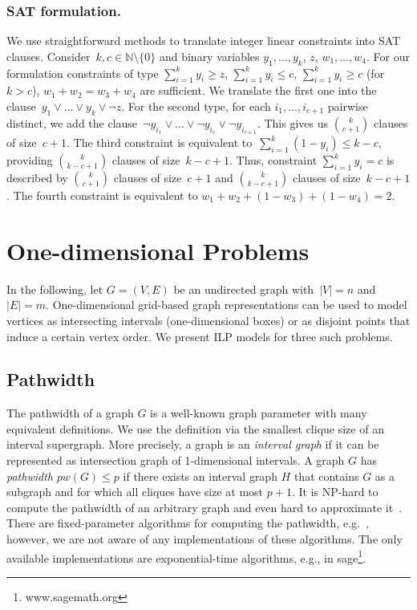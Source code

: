 \documentclass[runningheads]{llncs}
\newcounter{constr}
\begin{document}
\subsubsection{SAT formulation.}
\label{se:1dim:sat}



We use straightforward methods to translate 
integer linear constraints into SAT clauses.
Consider~$k,c \in \mathbb N \setminus \{ 0 \}$ and binary variables 
$y_1, \ldots, y_k$, $z$, $w_1, \ldots, w_4$.
For our formulation constraints 
of type
$\sum_{i=1}^k y_i \geq z$, 
$\sum_{i=1}^k y_i \leq c$, 
$\sum_{i=1}^k y_i \geq c$ (for $k > c$),
$w_1 + w_2 = w_3 + w_4$ are sufficient.
We translate the first one
into the clause~$y_1 \vee \ldots \vee y_k \vee \neg z$.
For the second type, for each $i_1, \ldots, i_{c+1}$ pairwise distinct,
we add the clause~$\neg y_{i_1} \vee \ldots \vee \neg y_{i_c} \vee \neg y_{i_{c+1}}$. 
This gives us $\binom{k}{c+1}$ clauses of size~$c+1$.
The third constraint is equivalent to~$\sum_{i=1}^k (1 - y_i) \leq k-c$,
providing $\binom{k}{k-c+1}$ clauses of size~$k-c+1$.
Thus, constraint $\sum_{i=1}^k y_i = c$
is described by $\binom{k}{c+1}$ clauses of size~$c+1$
and $\binom{k}{k-c+1}$ clauses of size~$k-c+1$. 
The fourth constraint is equivalent to $w_1 + w_2 + (1-w_3) + (1 - w_4) = 2$.
\fi
\section{One-dimensional Problems}
\label{se:problems:1dim}
In the following, let $G = (V,E)$ be an undirected graph with~$|V|=n$ and~$|E|=m$. 
One-dimensional grid-based graph representations can be used to model vertices as intersecting intervals (one-dimensional boxes) or as disjoint points that induce a certain vertex order. We present ILP models for three such problems.


\subsection{Pathwidth}

The pathwidth of a graph $G$ is a well-known graph
parameter with many equivalent definitions. We use the definition via the
smallest clique size of an interval supergraph.
More precisely, a graph is an {\em interval graph} if it can be
represented as intersection graph of 1-dimensional intervals.  A
graph $G$ has {\em pathwidth} $pw(G)\leq p$ if there exists an
interval graph $H$ that contains $G$ as a subgraph and for which all
cliques have size at most $p+1$.
It is NP-hard to compute the pathwidth of an arbitrary graph and even
hard to approximate it~\cite{BodlaenderGKH91}. There are fixed-parameter algorithms for computing the pathwidth,
e.g.~\cite{BodlaenderK96}, however, we are not aware of any
implementations of these algorithms.  The only available implementations are exponential-time algorithms, 
e.g., in
sage\footnote{www.sagemath.org}. 
\end{document}

